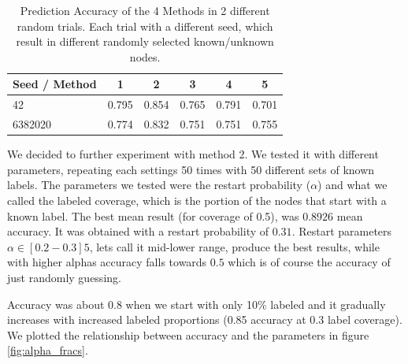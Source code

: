 \begin{table}[!htb]
\caption{Prediction Accuracy of the 4 Methods in 2 different random
trials. Each trial with a different seed, which result in different randomly
selected known/unknown nodes.} 
\begin{center}
\begin{tabular}{ | l | c | c | c | c | c | }
\hline
Seed / Method & 1 & 2 & 3 & 4 & 5\\
\hline
42 & 0.795 & 0.854 & 0.765 &
0.791 & 0.701\\
6382020 & 0.774 & 0.832 & 0.751 & 0.751 & 0.755\\
\hline
\end{tabular}
\label{table:results_5_prediction_methods}
\end{center}
\end{table}

We decided to further experiment with method 2.
We tested it with different parameters, repeating each settings 50 times
with 50 different sets of known labels. The parameters we tested were
the restart probability ($\alpha$) and what we called the labeled
coverage, which is the portion of the nodes that start with a known
label.
The best mean result (for coverage of 0.5), was $0.8926$ mean accuracy.
It was obtained with a
restart probability of $0.31$. Restart parameters $\alpha \in [0.2-0.3]5$, lets
call it mid-lower range, produce the best results, while with higher
alphas accuracy falls towards $0.5$ which is of course the accuracy of
just randomly guessing. 

Accuracy was about 0.8 when we start with only 10\% labeled and it
gradually increases with increased labeled proportions (0.85 accuracy at
0.3 label coverage). We plotted the relationship between accuracy and
the parameters in figure \ref{fig:alpha_fracs}.

